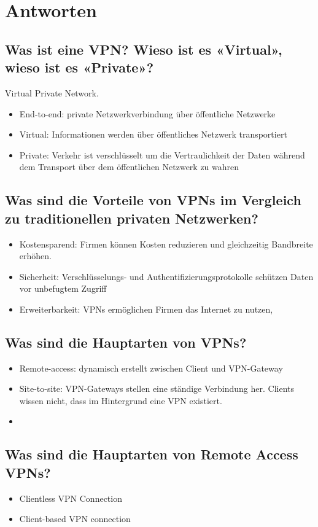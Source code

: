 \section{Antworten}
\subsection*{Was ist eine VPN? Wieso ist es «Virtual», wieso ist es «Private»?}
Virtual Private Network.
\begin{itemize}
    \item End-to-end: private Netzwerkverbindung über öffentliche Netzwerke
    \item Virtual: Informationen werden über öffentliches Netzwerk transportiert
    \item Private: Verkehr ist verschlüsselt um die Vertraulichkeit der Daten während dem Transport über dem öffentlichen Netzwerk zu wahren
\end{itemize}
\subsection*{Was sind die Vorteile von VPNs im Vergleich zu traditionellen privaten Netzwerken?}
\begin{itemize}
    \item Kostensparend: Firmen können Kosten reduzieren und gleichzeitig Bandbreite erhöhen.
    \item Sicherheit: Verschlüsselungs- und Authentifizierungsprotokolle schützen Daten vor unbefugtem Zugriff
    \item Erweiterbarkeit: VPNs ermöglichen Firmen das Internet zu nutzen,
\end{itemize}
\subsection*{Was sind die Hauptarten von VPNs?}
\begin{itemize}
    \item Remote-access: dynamisch erstellt zwischen Client und VPN-Gateway
    \item Site-to-site: VPN-Gateways stellen eine ständige Verbindung her. Clients wissen nicht, dass im Hintergrund eine VPN existiert.
    \item
\end{itemize}
\subsection*{Was sind die Hauptarten von Remote Access VPNs?}
\begin{itemize}
    \item Clientless VPN Connection
    \item Client-based VPN connection
\end{itemize}
